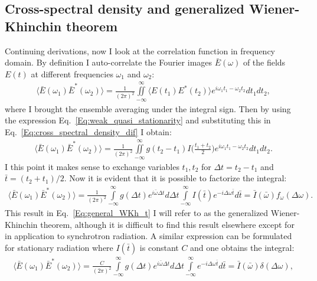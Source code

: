     
\subsection{Cross-spectral density and generalized Wiener-Khinchin theorem}
    
    Continuing derivations, now I look at the correlation function in frequency domain. By definition I auto-correlate the Fourier images $\bar{E}(\omega)$ of the fields $E(t)$ at different frequencies $\omega_1$ and $\omega_2$:
    \begin{align}
        \langle \bar{E}(\omega_1)\bar{E}^*(\omega_2) \rangle = \frac{1}{(2 \pi)^2} \iint \limits_{-\infty}^{\infty} \langle E(t_1)E^*(t_2) \rangle e^{i \omega_1 t_1 - \omega_2 t_2} dt_1 dt_2, 
        \label{Eq:cross_spectral_density_dif}
    \end{align}
    where I brought the ensemble averaging under the integral sign. Then by using the expression Eq.~\ref{Eq:weak_quasi_stationarity} and substituting this in Eq.~\ref{Eq:cross_spectral_density_dif} I obtain:
    \begin{align}
        \langle \bar{E}(\omega_1)\bar{E}^*(\omega_2) \rangle = \frac{1}{(2 \pi)^2} \iint \limits_{-\infty}^{\infty}  g(t_2 - t_1)I\bigg(\frac{t_1 + t_2}{2}\bigg) e^{i \omega_1 t_1 - \omega_2 t_2} dt_1 dt_2.
    \end{align}
    I this point it makes sense to exchange variables $t_1, t_2$ for $\Delta t = t_2 - t_1$ and $\bar{t} = (t_2 + t_1)/2$. Now it is evident that it is possible to factorize the integral:
    \begin{align}
        \langle \bar{E}(\omega_1)\bar{E}^*(\omega_2) \rangle = \frac{1}{(2 \pi)^2} \int \limits_{-\infty}^{\infty}  g(\Delta t) e^{i \bar{\omega} \Delta t} d \Delta t  \int \limits_{-\infty}^{\infty} I(\bar{t}) e^{-i \Delta \omega \bar{t}} d\bar{t} = \bar{I}(\bar{\omega})f_{\omega}(\Delta \omega).
        \label{Eq:general_WKh_t}
    \end{align}
    This result in Eq.~\ref{Eq:general_WKh_t} I will refer to as the generalized Wiener-Khinchin theorem, although it is difficult to find this result elsewhere except for~\cite{geloni_statistical_2006}  in application to synchrotron radiation. A similar expression can be formulated for stationary radiation where $I(\bar{t})$ is constant $C$ and one obtains the integral:
    \begin{align}
        \langle \bar{E}(\omega_1)\bar{E}^*(\omega_2) \rangle = \frac{C}{(2 \pi)^2} \int \limits_{-\infty}^{\infty}  g(\Delta t) e^{i \bar{\omega} \Delta t} d \Delta t  \int \limits_{-\infty}^{\infty} e^{-i \Delta \omega \bar{t}} d\bar{t} = \bar{I}(\bar{\omega})\delta(\Delta \omega),
        \label{Eq:WKh_t_derivation}
    \end{align}
